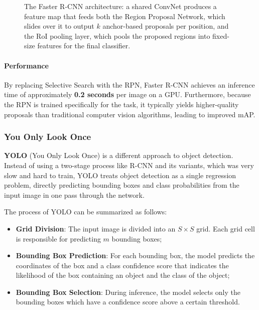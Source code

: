 \begin{figure}[H]
    \centering
    \resizebox{\textwidth}{!}{}
    \caption{The Faster R-CNN architecture: a shared ConvNet produces a feature map that feeds both the Region Proposal Network, which slides over it to output $k$ anchor-based proposals per position, and the RoI pooling layer, which pools the proposed regions into fixed-size features for the final classifier.}
    \label{fig:faster-rcnn-architecture}
\end{figure}

\paragraph{Performance}
By replacing Selective Search with the RPN, Faster R-CNN achieves an inference time of approximately \textbf{0.2 seconds} per image on a GPU. 
Furthermore, because the RPN is trained specifically for the task, it typically yields higher-quality proposals than traditional computer vision algorithms, leading to improved mAP.

\subsubsection{You Only Look Once}
\textbf{YOLO} (You Only Look Once) is a different approach to object detection. Instead of using a two-stage process like R-CNN and its variants,
which was very slow and hard to train, YOLO treats object detection as a single regression problem, 
directly predicting bounding boxes and class probabilities from the input image in one pass through the network.

The process of YOLO can be summarized as follows:
\begin{itemize}
    \item \textbf{Grid Division}: The input image is divided into an $S \times S$ grid. 
    Each grid cell is responsible for predicting $m$ bounding boxes;
    
    \item \textbf{Bounding Box Prediction}: For each bounding box, the model predicts the coordinates of
    the box and a class confidence score that indicates the likelihood of the box containing an object and the class of the object;
    
    \item \textbf{Bounding Box Selection}: During inference, the model selects only the bounding boxes which have
    a confidence score above a certain threshold.
\end{itemize}

